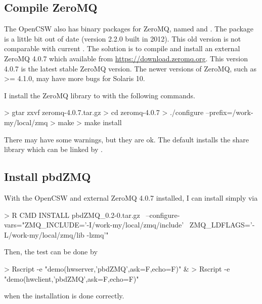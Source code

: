 \subsection[Compile ZeroMQ]{Compile ZeroMQ}
\label{sec:compile_zeromq}
The OpenCSW also has binary packages for ZeroMQ, named  and
.
The package is a little bit out of date (version 2.2.0 built in 2012).
This old version is not comparable with current .
The solution is to compile and install an external ZeroMQ 4.0.7
which available from \url{https://download.zeromq.org}.
This version 4.0.7 is the latest stable ZeroMQ version.
The newer versions of ZeroMQ, such as >= 4.1.0, may have more bugs
for Solaris 10.

I install the ZeroMQ library to  with
the following commands.
\begin{Code}
> gtar zxvf zeromq-4.0.7.tar.gz
> cd zeromq-4.0.7
> ./configure --prefix=/work-my/local/zmq 
> make
> make install
\end{Code}
There may have some warnings, but they are ok. The default installs
the share library which can be linked by .


\subsection[Install pbdZMQ]{Install pbdZMQ}
\label{sec:install_pbdzmq}
With the OpenCSW and external ZeroMQ 4.0.7 installed, I can install
 simply via
\begin{Code}
> R CMD INSTALL pbdZMQ_0.2-0.tar.gz \
  --configure-vars="ZMQ_INCLUDE='-I/work-my/local/zmq/include' \
                    ZMQ_LDFLAGS='-L/work-my/local/zmq/lib -lzmq'"
\end{Code}
Then, the test can be done by
\begin{Code}
> Rscript -e "demo(hwserver,'pbdZMQ',ask=F,echo=F)" &
> Rscript -e "demo(hwclient,'pbdZMQ',ask=F,echo=F)"
\end{Code}
when the  installation is done correctly.

